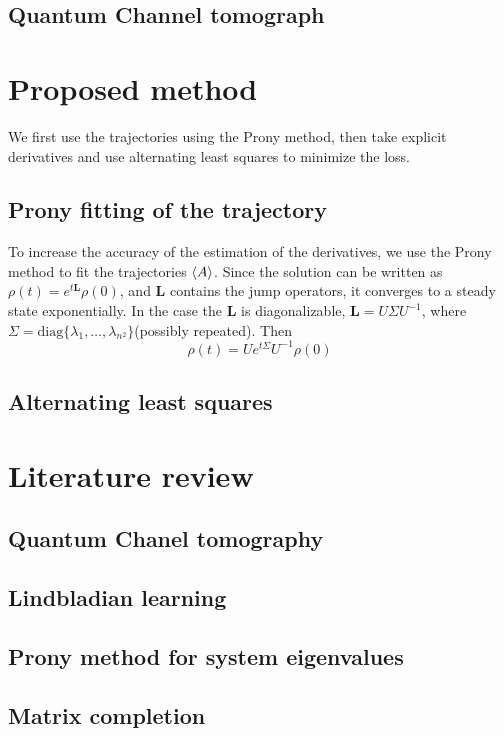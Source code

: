 \documentclass[10pt]{article}  %
\theoremstyle{plain}
\numberwithin{equation}{section}
\newcommand{\bL}{\mathbf{L}}
\newcommand{\diag}{\text{diag}}
\begin{document}
\subsection{Quantum Channel tomograph}








\section{Proposed method}
We first use the trajectories using the Prony method, then take explicit derivatives and use alternating least squares to minimize the loss. 
\subsection{Prony fitting of the trajectory}
To increase the accuracy of the estimation of the derivatives, we use the Prony method to fit the trajectories $\expval{A}$. Since the solution can be written as $\rho(t) = e^{t\bL } \rho(0)$, and $\bL$ contains the jump operators, it converges to a steady state exponentially. In the case the $\bL$ is diagonalizable, $\bL = U \Sigma U^{-1}$, where $\Sigma = \diag\{\lambda_1, \dots, \lambda_{n^2}\}$(possibly repeated). Then 
\begin{equation}
	\rho(t) = Ue^{t\Sigma}U^{-1}\rho(0)
\end{equation}
\subsection{Alternating least squares}



\section{Literature review}

\subsection{Quantum Chanel tomography}
\subsection{Lindbladian learning}
\subsection{Prony method for system eigenvalues}
\subsection{Matrix completion}
\end{document}
